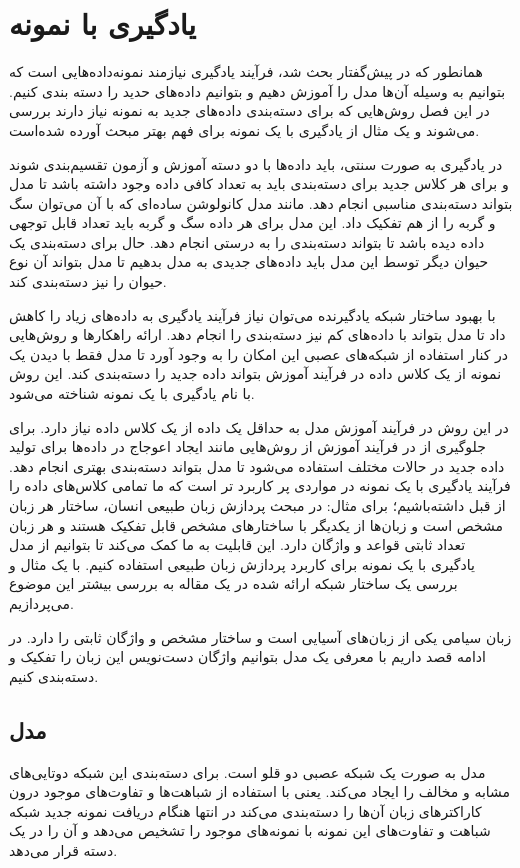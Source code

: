 \chapter{یادگیری با نمونه}
\label{chap:two}
همانطور که در پیش‌گفتار بحث شد، فرآیند یادگیری نیازمند نمونه‌داده‌هایی است که بتوانیم به وسیله آن‌ها مدل را آموزش دهیم  و بتوانیم داده‌های حدید را دسته بندی کنیم. در این فصل روش‌هایی که برای دسته‌بندی داده‌های جدید به نمونه نیاز دارند بررسی می‌شوند و یک مثال از یادگیری با یک نمونه برای فهم بهتر مبحث آورده شده‌است.

در یادگیری به صورت سنتی، باید داده‌ها با دو دسته آموزش و آزمون تقسیم‌بندی شوند و برای هر کلاس جدید برای دسته‌بندی باید به تعداد کافی داده وجود داشته باشد تا مدل بتواند دسته‌بندی مناسبی انجام دهد. مانند مدل کانولوشن ساده‌ای که با آن می‌توان سگ و گربه را از هم تفکیک داد. این مدل برای هر داده سگ و گربه باید تعداد قابل توجهی داده دیده باشد تا بتواند دسته‌بندی را به درستی انجام دهد. حال برای دسته‌بندی یک حیوان دیگر توسط این مدل باید داده‌های جدیدی به مدل بدهیم تا مدل بتواند آن نوع حیوان را نیز دسته‌‌بندی کند.

با بهبود ساختار شبکه یادگیرنده می‌توان نیاز فرآیند یادگیری به داده‌های زیاد را کاهش داد تا مدل بتواند با داده‌های کم نیز دسته‌بندی را انجام دهد. ارائه راهکار‌ها و روش‌هایی در کنار استفاده از شبکه‌های عصبی این امکان را به وجود آورد تا مدل فقط با دیدن یک نمونه از یک کلاس داده در فرآیند آموزش بتواند داده جدید را دسته‌بندی کند. این روش با نام یادگیری با یک نمونه شناخته می‌شود.

در این روش در فرآیند آموزش مدل به حداقل یک داده از یک کلاس داده نیاز دارد. برای جلوگیری از 
 در فرآیند آموزش از روش‌هایی مانند ایجاد اعوجاج در داده‌ها برای تولید داده جدید در حالات مختلف استفاده می‌شود تا مدل بتواند دسته‌بندی بهتری انجام دهد. فرآیند یادگیری با یک نمونه در مواردی پر کاربرد تر است که ما تمامی کلاس‌های داده را از قبل داشته‌باشیم؛ برای مثال: در مبحث پردازش زبان طبیعی انسان، ساختار هر زبان مشخص است و زبان‌ها از یکدیگر با ساختار‌های مشخص قابل تفکیک هستند و هر زبان تعداد ثابتی قواعد و واژگان دارد. این قابلیت به ما کمک می‌کند تا بتوانیم از مدل یادگیری با یک نمونه برای کاربرد پردازش زبان طبیعی استفاده کنیم. با یک مثال و بررسی یک ساختار شبکه ارائه شده در یک مقاله به بررسی بیشتر این موضوع می‌پردازیم. 
 
 زبان سیامی یکی از زبان‌های آسیایی است و ساختار مشخص و واژگان ثابتی را دارد. در ادامه قصد داریم با معرفی یک مدل بتوانیم واژگان دست‌نویس این زبان  را تفکیک و دسته‌بندی کنیم.
 
 \section{مدل}
 مدل به صورت یک شبکه عصبی دو قلو است. برای دسته‌بندی این شبکه دوتایی‌های مشابه و مخالف را ایجاد می‌کند. یعنی با استفاده از شباهت‌ها و تفاوت‌های موجود درون کاراکترهای زبان آن‌ها را دسته‌بندی می‌کند در انتها هنگام دریافت نمونه جدید شبکه شباهت و تفاوت‌های این نمونه با نمونه‌های موجود را تشخیص می‌دهد و آن را در یک دسته قرار می‌دهد.
 
